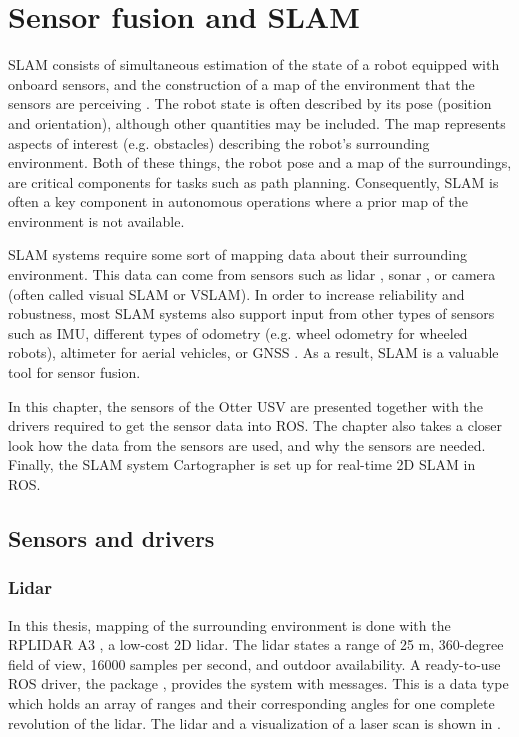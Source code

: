 \chapter{Sensor fusion and SLAM} \label{ch:slam}

SLAM consists of simultaneous estimation of the state of a robot equipped with onboard sensors, and the construction of a map of the environment that the sensors are perceiving \citep{slamtut2006part1}. The robot state is often described by its pose (position and orientation), although other quantities may be included. The map represents aspects of interest (e.g. obstacles) describing the robot's surrounding environment. Both of these things, the robot pose and a map of the surroundings, are critical components for tasks such as path planning. Consequently, SLAM is often a key component in autonomous operations where a prior map of the environment is not available.

SLAM systems require some sort of mapping data about their surrounding environment. This data can come from sensors such as lidar \citep{cartographerPaper}, sonar \citep{norgren2018multibeam}, or camera \citep{orbslam2017} (often called visual SLAM or VSLAM). In order to increase reliability and robustness, most SLAM systems also support input from other types of sensors such as IMU, different types of odometry (e.g. wheel odometry for wheeled robots), altimeter for aerial vehicles, or GNSS \citep{website:Cartographer,hector2011slam}. As a result, SLAM is a valuable tool for sensor fusion. 

In this chapter, the sensors of the Otter USV are presented together with the drivers required to get the sensor data into ROS. The chapter also takes a closer look how the data from the sensors are used, and why the sensors are needed. Finally, the SLAM system Cartographer \citep{cartographerPaper} is set up for real-time 2D SLAM in ROS.

\section{Sensors and drivers}

\subsection{Lidar}

In this thesis, mapping of the surrounding environment is done with the RPLIDAR A3 \citep{website:rplidara3}, a low-cost 2D lidar. The lidar states a range of 25 m, 360-degree field of view, 16000 samples per second, and outdoor availability. A ready-to-use ROS driver, the  package \citep{website:rplidarDriver}, provides the system with  messages. This is a data type which holds an array of ranges and their corresponding angles for one complete revolution of the lidar. The lidar and a visualization of a laser scan is shown in .


